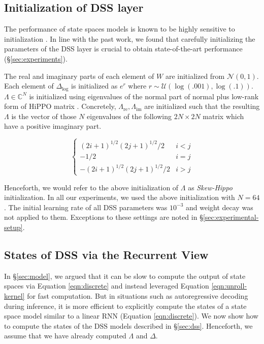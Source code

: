 \subsection{Initialization of DSS layer}\label{sec:dss-init}

The performance of state spaces models is known to be highly sensitive to initialization \cite{gu2022efficiently}. In line with the past work, we found that carefully initializing the parameters of the DSS layer is crucial to obtain state-of-the-art performance (\S\ref{sec:experiments}).

The real and imaginary parts of each element of $W$ are initialized from $\mathcal{N}(0,1)$. Each element of $\Delta_{\log}$ is initialized as $e^r$ where $r \sim \mathcal{U}(\log(.001), \log(.1))$.\ $\Lambda \in \mathbb{C}^{N}$ is initialized using eigenvalues of the normal part of normal plus low-rank form of HiPPO matrix \cite{gu2022efficiently}. Concretely, $\Lambda_\mathrm{re}, \Lambda_\mathrm{im}$ are initialized such that the resulting $\Lambda$ is the vector of those $N$ eigenvalues of the following $2N \times 2N$ matrix which have a positive imaginary part.

\begin{equation*}
\begin{cases}
    (2i+1)^{1/2}(2j+1)^{1/2}/2  & i < j  \\
    -1/2                        & i = j  \\
    -(2i+1)^{1/2}(2j+1)^{1/2}/2 & i > j  
\end{cases}
\end{equation*}

Henceforth, we would refer to the above initialization of $\Lambda$ as \emph{Skew-Hippo} initialization. In all our experiments, we used the above initialization with $N=64$. The initial learning rate of all DSS parameters was $10^{-3}$ and weight decay was not applied to them. Exceptions to these settings are noted in \S\ref{sec:experimental-setup}. 

\subsection{States of DSS via the Recurrent View}\label{sec:rnn}

In \S\ref{sec:model}, we argued that it can be slow to compute the output of state spaces via Equation \ref{eqn:discrete} and instead leveraged Equation \ref{eqn:unroll-kernel} for fast computation. But in situations such as autoregressive decoding during inference, it is more efficient to explicitly compute the states of a state space model similar to a linear RNN (Equation \ref{eqn:discrete}). We now show how to compute the states of the $\mathrm{DSS}$ models described in \S\ref{sec:dss}. Henceforth, we assume that we have already computed $\Lambda$ and $\Delta$. 

